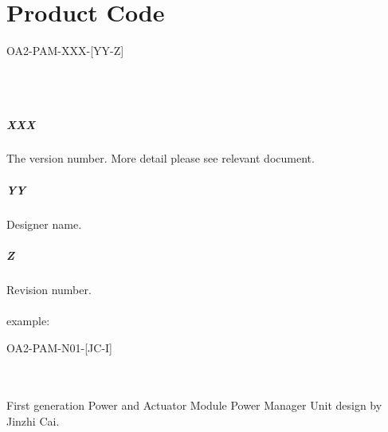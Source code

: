 \documentclass[12pt,article]{memoir}
\begin{document}
\section{Product Code}
\begin{LARGE}
OA2-PAM-XXX-[YY-Z]
\end{LARGE}\\\\
\subparagraph{XXX}
The version number. More detail please see relevant document.
\subparagraph{YY}
Designer name.
\subparagraph{Z}
Revision number.\\\\
example: 
\begin{large}
OA2-PAM-N01-[JC-I]
\end{large}\\\\
First generation Power and Actuator Module Power Manager Unit design by Jinzhi Cai.
\newpage
\end{document}
